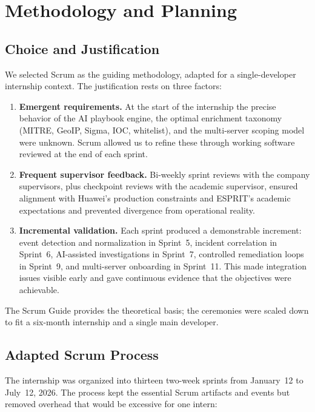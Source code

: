 
\section{Methodology and Planning}

\subsection{Choice and Justification}

We selected Scrum as the guiding methodology, adapted for a single-developer internship context. The justification rests on three factors:

\begin{enumerate}[leftmargin=1cm]
  \item \textbf{Emergent requirements.} At the start of the internship the precise behavior of the AI playbook engine, the optimal enrichment taxonomy (MITRE, GeoIP, Sigma, IOC, whitelist), and the multi-server scoping model were unknown. Scrum allowed us to refine these through working software reviewed at the end of each sprint.
  \item \textbf{Frequent supervisor feedback.} Bi-weekly sprint reviews with the company supervisors, plus checkpoint reviews with the academic supervisor, ensured alignment with Huawei's production constraints and ESPRIT's academic expectations and prevented divergence from operational reality.
  \item \textbf{Incremental validation.} Each sprint produced a demonstrable increment: event detection and normalization in Sprint~5, incident correlation in Sprint~6, AI-assisted investigations in Sprint~7, controlled remediation loops in Sprint~9, and multi-server onboarding in Sprint~11. This made integration issues visible early and gave continuous evidence that the objectives were achievable.
\end{enumerate}

The Scrum Guide \cite{scrum_guide} provides the theoretical basis; the ceremonies were scaled down to fit a six-month internship and a single main developer.

\subsection{Adapted Scrum Process}

The internship was organized into thirteen two-week sprints from January~12 to July~12, 2026. The process kept the essential Scrum artifacts and events but removed overhead that would be excessive for one intern:

